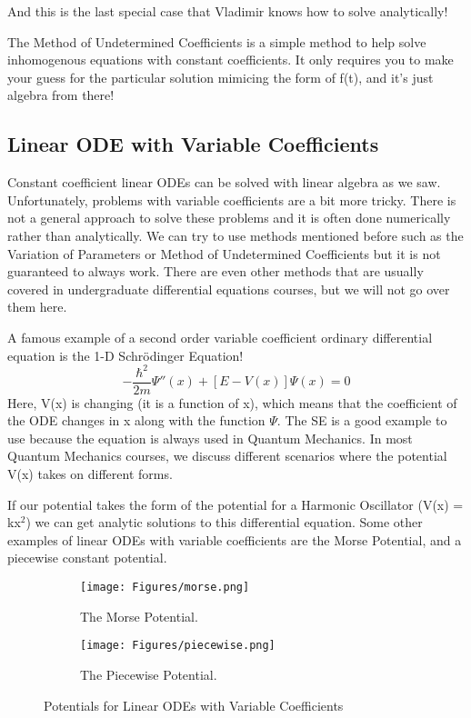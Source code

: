 \documentclass{article}
\newcommand{\be}{\begin{equation}}
\newcommand{\ee}{\end{equation}}
\begin{document}
And this is the last special case that Vladimir knows how to solve analytically!

The Method of Undetermined Coefficients is a simple method to help solve inhomogenous equations with constant coefficients.
It only requires you to make your guess for the particular solution mimicing the form of f(t), and it's just algebra from there!

\subsection*{Linear ODE with Variable Coefficients}
Constant coefficient linear ODEs can be solved with linear algebra as we saw.
Unfortunately, problems with variable coefficients are a bit more tricky.
There is not a general approach to solve these problems and it is often done numerically rather than analytically.
We can try to use methods mentioned before such as the Variation of Parameters or Method of Undetermined Coefficients but it is not guaranteed to always work.
There are even other methods that are usually covered in undergraduate differential equations courses, but we will not go over them here.

A famous example of a second order variable coefficient ordinary differential equation is the 1-D Schr\"odinger Equation!
\be
-\frac{\hbar^2}{2m} \Psi''(x) + [E - V(x)] \Psi(x) = 0
\ee
Here, V(x) is changing (it is a function of x), which means that the coefficient of the ODE changes in x along with the function $\Psi$.
The SE is a good example to use because the equation is always used in Quantum Mechanics. In most Quantum Mechanics courses, we discuss different scenarios where the potential V(x) takes on different forms.

If our potential takes the form of the potential for a Harmonic Oscillator (V(x) = kx$^2$) we can get analytic solutions to this differential equation.
Some other examples of linear ODEs with variable coefficients are the Morse Potential, and a piecewise constant potential.

\begin{figure}[H]
    \centering
    \begin{subfigure}[b]{0.49\textwidth}
        \texttt{[image: Figures/morse.png]}
  	\caption{The Morse Potential.}
    \end{subfigure}
    \begin{subfigure}[b]{0.49\textwidth}
        \texttt{[image: Figures/piecewise.png]}
        \caption{The Piecewise Potential.}
    \end{subfigure}
    \caption{Potentials for Linear ODEs with Variable Coefficients}
\end{figure}
\end{document}
